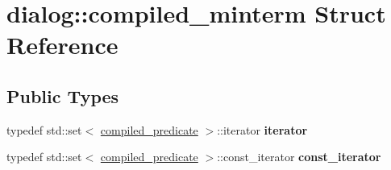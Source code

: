 \hypertarget{structdialog_1_1compiled__minterm}{}\section{dialog\+:\+:compiled\+\_\+minterm Struct Reference}
\label{structdialog_1_1compiled__minterm}
\subsection*{Public Types}
\begin{DoxyCompactItemize}
\item 
\mbox{\label{structdialog_1_1compiled__minterm_ac790c95326bfbde518899202a42db0d5}} 
typedef std\+::set$<$ \hyperlink{structdialog_1_1compiled__predicate}{compiled\+\_\+predicate} $>$\+::iterator {\bfseries iterator}
\item 
\mbox{\label{structdialog_1_1compiled__minterm_a37352ef984da3a751ab3b9bc2642b983}} 
typedef std\+::set$<$ \hyperlink{structdialog_1_1compiled__predicate}{compiled\+\_\+predicate} $>$\+::const\+\_\+iterator {\bfseries const\+\_\+iterator}
\end{DoxyCompactItemize}
